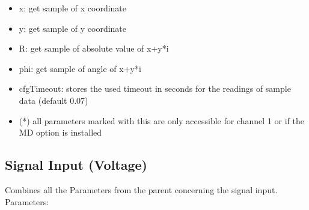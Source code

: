 \documentclass[11pt]{article} %
\begin{document}
\begin{itemize}

	\item x: get sample of x coordinate
	\item y: get sample of y coordinate
	\item R: get sample of absolute value of x+y*i
	\item phi: get sample of angle of x+y*i
	\item cfgTimeout: stores the  used timeout in seconds for the readings of sample data (default 0.07)
	\item (*) all parameters marked with this are only accessible for channel 1 or if the MD option is installed
	\end{itemize}


\subsection{Signal Input (Voltage)}
    Combines all the Parameters from the parent concerning the signal input. Parameters:
    
\end{document}

